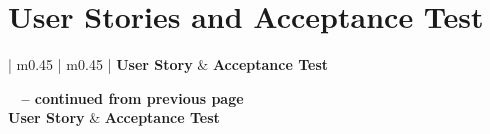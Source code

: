
\chapter{User Stories and Acceptance Test}
\label{app:user_stories_and_acceptance_test}

\begin{center}
\begin{longtable}{| m{} | m{} |}
\hline
  \textbf{User Story}
& \textbf{Acceptance Test} \\ \hline
\endfirsthead

%
{{\bfseries \tablename\ \thetable{} -- continued from previous page}} \\
\hline
  \textbf{User Story}
& \textbf{Acceptance Test} \\ \hline
\endhead

\hline {} \\ \hline
\endfoot
\endlastfoot


\end{longtable}
\end{center}
